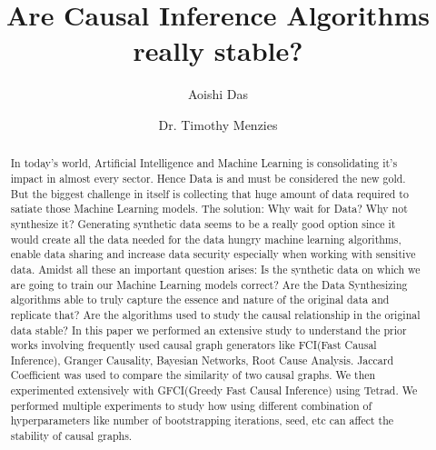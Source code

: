 \documentclass[sigconf,review,anonymous,nonacm=true]{acmart}
\begin{document}
\title{Are Causal Inference Algorithms really stable?}

\author{Aoishi Das}

\author{Dr. Timothy Menzies}




\begin{abstract}
  In today's world, Artificial Intelligence and Machine Learning is consolidating it's impact in almost every sector. Hence Data is and must be considered the new gold. But the biggest challenge in itself is collecting that huge amount of data required to satiate those Machine Learning models. The solution: Why wait for Data? Why not synthesize it? Generating synthetic data seems to be a really good option since it would create all the data needed for the data hungry machine learning algorithms, enable data sharing and increase data security especially when working with sensitive data. Amidst all these an important question arises: Is the synthetic data on which we are going to train our Machine Learning models correct? Are the Data Synthesizing algorithms able to truly capture the essence and nature of the original data and replicate that? Are the algorithms used to study the causal relationship in the original data stable? In this paper we performed an extensive study to understand the prior works involving frequently used causal graph generators like FCI(Fast Causal Inference), Granger Causality, Bayesian Networks, Root Cause Analysis. Jaccard Coefficient was used to compare the similarity of two causal graphs. We then experimented extensively with GFCI(Greedy Fast Causal Inference) using Tetrad\cite{TTT}. We performed multiple experiments to study how using different combination of hyperparameters like number of bootstrapping iterations, seed, etc can affect the stability of causal graphs. 
\end{abstract}
\end{document}
